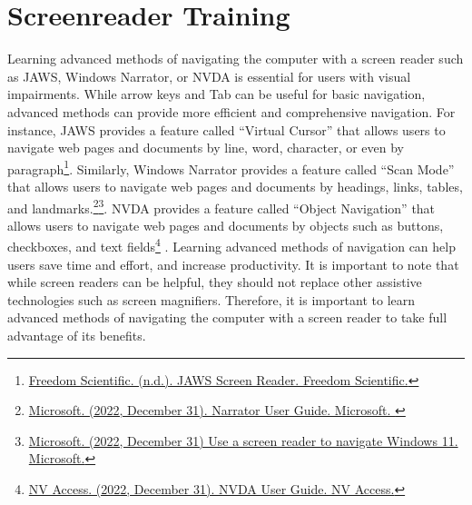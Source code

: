 \pagebreak\hypertarget{appx7}{}\section[Screenreader Training]{Screenreader Training}\label{appx7}
Learning advanced methods of navigating the computer with a screen reader such as JAWS, Windows Narrator, or NVDA is essential for users with visual impairments. While arrow keys and Tab can be useful for basic navigation, advanced methods can provide more efficient and comprehensive navigation. For instance, JAWS provides a feature called “Virtual Cursor” that allows users to navigate web pages and documents by line, word, character, or even by paragraph\footnote{\raggedright \href{https://www.freedomscientific.com/products/software/jaws}{Freedom Scientific. (n.d.). JAWS Screen Reader. Freedom Scientific.}}. Similarly, Windows Narrator provides a feature called “Scan Mode” that allows users to navigate web pages and documents by headings, links, tables, and landmarks.\footnote{\raggedright \href{https://support.microsoft.com/en-us/windows/narrator-user-guide-4b2e6b3f-1d6d-8a5c-4f6d2a3b3d6f}{Microsoft. (2022, December 31). Narrator User Guide. Microsoft. }}\fnsep\footnote{\raggedright \href{https://support.microsoft.com/en-us/windows/use-a-screen-reader-to-navigate-windows-11-5f8a9e7c-7d3e-2d5a-0f5c-5f9b5b8a7a3d}{Microsoft. (2022, December 31) Use a screen reader to navigate Windows 11. Microsoft.}}. NVDA provides a feature called “Object Navigation” that allows users to navigate web pages and documents by objects such as buttons, checkboxes, and text fields\footnote{\raggedright \href{https://www.nvaccess.org/files/nvda/documentation/userGuide.html\#toc3.1}{NV Access. (2022, December 31). NVDA User Guide. NV Access.}} . Learning advanced methods of navigation can help users save time and effort, and increase productivity. It is important to note that while screen readers can be helpful, they should not replace other assistive technologies such as screen magnifiers. Therefore, it is important to learn advanced methods of navigating the computer with a screen reader to take full advantage of its benefits.
